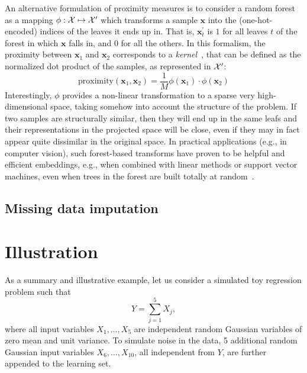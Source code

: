 An alternative formulation of proximity measures is to consider a random forest
as a mapping $\phi: {\cal X} \mapsto {\cal X}^\prime$ which transforms a sample
$\mathbf{x}$ into the (one-hot-encoded) indices of the leaves it ends up in.
That is, $\mathbf{x}^\prime_t$ is $1$ for all leaves $t$ of the forest in which
$\mathbf{x}$ falls in, and $0$ for all the others. In this formalism, the
proximity between $\mathbf{x}_1$ and $\mathbf{x}_2$ corresponds to a
\textit{kernel}~\citep{scholkopf:2001}, that can be defined as the normalized
dot product of the samples, as represented in ${\cal X}^\prime$:
\begin{equation}
\text{proximity}(\mathbf{x}_1, \mathbf{x}_2) = \frac{1}{M} \phi(\mathbf{x}_1) \cdot \phi(\mathbf{x}_2)
\end{equation}
Interestingly, $\phi$ provides a non-linear transformation to a sparse very
high-dimensional space, taking somehow into account the structure of the
problem. If two samples are structurally similar, then they will end up in the
same leafs and their representations in the projected space will be close, even
if they may in fact appear quite dissimilar in the original space.  In practical
applications (e.g., in computer vision), such forest-based transforms have
proven to be helpful and efficient embeddings, e.g., when combined with linear
methods or support vector machines, even when trees in the forest are built
totally at random~\citep{moosmann:2006,maree:2013}.

\subsection{Missing data imputation}
\todo{}

\section{Illustration}
\label{sec:4:illustration}

As a summary and illustrative example, let us consider a simulated toy
regression problem such that
\begin{equation}
Y = \sum_{j=1}^{5} X_j,
\end{equation}
where all input variables $X_1,\dots,X_{5}$ are independent
random Gaussian variables of zero mean and unit variance. To simulate
noise in the data, 5 additional random Gaussian input variables $X_{6},\dots,X_{10}$,
all independent from $Y$, are further appended to the learning set.

